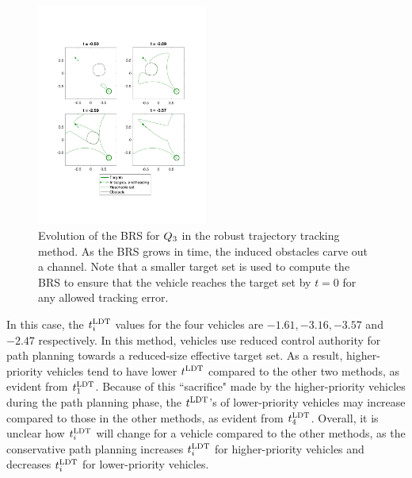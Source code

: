 \begin{figure}[H]
  \centering
  \includegraphics[width=0.50\textwidth]{"fig/rtt_rs3"}
  \caption{Evolution of the BRS for $Q_3$ in the robust trajectory tracking method. As the BRS grows in time, the induced obstacles carve out a channel. Note that a smaller target set is used to compute the BRS to ensure that the vehicle reaches the target set by $t=0$ for any allowed tracking error.}
  \label{fig:rtt_rs3}
  \vspace{-1em}
\end{figure}
\vspace{-0.2em}

In this case, the $t^\text{LDT}_i$ values for the four vehicles are $-1.61, -3.16, -3.57$ and $-2.47$ respectively. In this method, vehicles use reduced control authority for path planning towards a reduced-size effective target set. As a result, higher-priority vehicles tend to have lower $t^\text{LDT}$ compared to the other two methods, as evident from $t^\text{LDT}_1$. Because of this ``sacrifice" made by the higher-priority vehicles during the path planning phase, the $t^\text{LDT}$'s of lower-priority vehicles may increase compared to those in the other methods, as evident from $t^\text{LDT}_4$. Overall, it is unclear how $t^\text{LDT}_i$ will change for a vehicle compared to the other methods, as the conservative path planning increases $t^\text{LDT}_i$ for higher-priority vehicles and decreases $t^\text{LDT}_i$ for lower-priority vehicles.